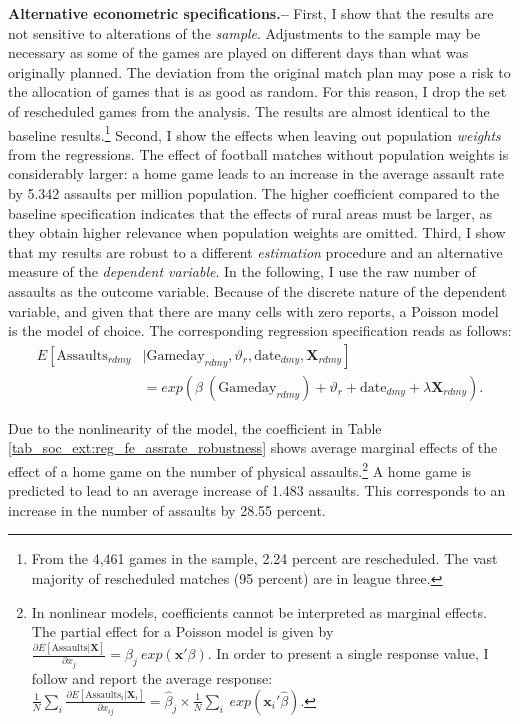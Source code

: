 \textbf{Alternative econometric specifications.--} First, I show that the results are not sensitive to alterations of the \textit{sample}. Adjustments to the sample may be necessary as some of the games are played on different days than what was originally planned. The deviation from the original match plan may pose a risk to the allocation of games that is as good as random. For this reason, I drop the set of rescheduled games from the analysis. The results are almost identical to the baseline results.\footnote{From the 4,461 games in the sample, 2.24 percent are rescheduled. The vast majority of rescheduled matches (95 percent) are in league three.} Second, I show the effects when leaving out population \textit{weights} from the regressions. The effect of football matches without population weights is considerably larger: a home game leads to an increase in the average assault rate by 5.342 assaults per million population. The higher coefficient compared to the baseline specification indicates that the effects of rural areas must be larger, as they obtain higher relevance when population weights are omitted. Third, I show that my results are robust to a different \textit{estimation} procedure and an alternative measure of the \textit{dependent variable}. In the following, I use the raw number of assaults as the outcome variable. Because of the discrete nature of the dependent variable, and given that there are many cells with zero reports, a Poisson model is the model of choice. The corresponding regression specification reads as follows:
\begin{align}
E\left[ \text{Assaults}_{rdmy}\right.&|\left.\text{Gameday}_{rdmy},\vartheta_r,\text{date}_{dmy}, \mathbf{X}_{rdmy} \right] \nonumber \\ &= exp\left( \beta\ (\text{Gameday}_{rdmy}) + \vartheta_r + \text{date}_{dmy} + \lambda\mathbf{X}_{rdmy} \right). 
\label{eq_soc_ext:poisson_model}
\end{align}

Due to the nonlinearity of the model, the coefficient in Table \ref{tab_soc_ext:reg_fe_assrate_robustness} shows average marginal effects of the effect of a home game on the number of physical assaults.\footnote{In nonlinear models, coefficients cannot be interpreted as marginal effects. The partial effect for a Poisson model is given by $\frac{\partial E\left[ \text{Assaults}| \mathbf{X}\right]}{\partial x_j} = \beta_j\ exp(\mathbf{x'}\beta)$. In order to present a single response value, I follow \cite{cameron2005microeconometrics} and report the average response: $\frac{1}{N}\sum_i \frac{\partial E\left[ \text{Assaults}_i| \mathbf{X}_i\right]}{\partial x_{ij}} = \hat\beta_j \times \frac{1}{N} \sum_i\ exp(\mathbf{x}_i'\hat\beta)$.} A home game is predicted to lead to an average increase of 1.483 assaults. This corresponds to an increase in the number of assaults by 28.55 percent. \newline


